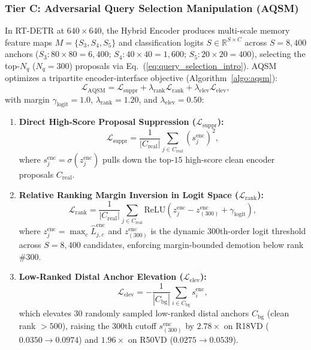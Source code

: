 \documentclass[preprint,10pt]{elsarticle}
\begin{document}
\subsubsection{Tier C: Adversarial Query Selection Manipulation (AQSM)}
In RT-DETR at $640 \times 640$, the Hybrid Encoder produces multi-scale memory feature maps $M = \{S_3, S_4, S_5\}$ and classification logits $S \in \mathbb{R}^{S \times C}$ across $S = 8,400$ anchors ($S_3: 80 \times 80 = 6,400$; $S_4: 40 \times 40 = 1,600$; $S_5: 20 \times 20 = 400$), selecting the top-$N_q$ ($N_q = 300$) proposals via Eq.~(\ref{eq:query_selection_intro}). AQSM optimizes a tripartite encoder-interface objective (Algorithm~\ref{algo:aqsm}):
\begin{equation}
\mathcal{L}_{\mathrm{AQSM}} = \mathcal{L}_{\mathrm{suppr}} + \lambda_{\mathrm{rank}} \mathcal{L}_{\mathrm{rank}} + \lambda_{\mathrm{elev}} \mathcal{L}_{\mathrm{elev}},
\label{eq:laqsm_tripartite}
\end{equation}
with margin $\gamma_{\mathrm{logit}} = 1.0$, $\lambda_{\mathrm{rank}} = 1.20$, and $\lambda_{\mathrm{elev}} = 0.50$:
\begin{enumerate}
    \item \textbf{Direct High-Score Proposal Suppression ($\mathcal{L}_{\mathrm{suppr}}$):}
    \begin{equation}
    \mathcal{L}_{\mathrm{suppr}} = \frac{1}{|C_{\mathrm{real}}|} \sum_{j \in C_{\mathrm{real}}} \left( s_j^{\mathrm{enc}} \right)^2,
    \label{eq:lsuppr}
    \end{equation}
    where $s_j^{\mathrm{enc}} = \sigma(z_j^{\mathrm{enc}})$ pulls down the top-$15$ high-score clean encoder proposals $C_{\mathrm{real}}$.
    \item \textbf{Relative Ranking Margin Inversion in Logit Space ($\mathcal{L}_{\mathrm{rank}}$):}
    \begin{equation}
    \mathcal{L}_{\mathrm{rank}} = \frac{1}{|C_{\mathrm{real}}|} \sum_{j \in C_{\mathrm{real}}} \mathrm{ReLU}\left( z_j^{\mathrm{enc}} - z_{(300)}^{\mathrm{enc}} + \gamma_{\mathrm{logit}} \right),
    \label{eq:lrank}
    \end{equation}
    where $z_j^{\mathrm{enc}} = \max_c \hat{L}_{j, c}^{\mathrm{enc}}$ and $z_{(300)}^{\mathrm{enc}}$ is the dynamic 300th-order logit threshold across $S = 8,400$ candidates, enforcing margin-bounded demotion below rank \#300.
    \item \textbf{Low-Ranked Distal Anchor Elevation ($\mathcal{L}_{\mathrm{elev}}$):}
    \begin{equation}
    \mathcal{L}_{\mathrm{elev}} = - \frac{1}{|C_{\mathrm{bg}}|} \sum_{i \in C_{\mathrm{bg}}} s_i^{\mathrm{enc}},
    \label{eq:lelev}
    \end{equation}
    which elevates 30 randomly sampled low-ranked distal anchors $C_{\mathrm{bg}}$ (clean rank $> 500$), raising the 300th cutoff $s_{(300)}^{\mathrm{enc}}$ by $2.78\times$ on R18VD ($0.0350 \to 0.0974$) and $1.96\times$ on R50VD ($0.0275 \to 0.0539$).
\end{enumerate}
\end{document}
